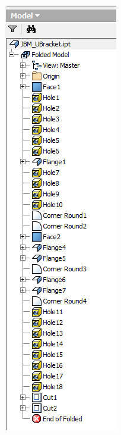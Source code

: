 \begin{minipage}{\linewidth}
\begin{minipage}[c]{0.3\linewidth}
\includegraphics[width=\linewidth,valign=t]{../Common/images/JBM_UBracket_origpart_tree}
 \label{fig:results:JBM_UBracket_origpart_tree}
\end{minipage}
\end{minipage}


